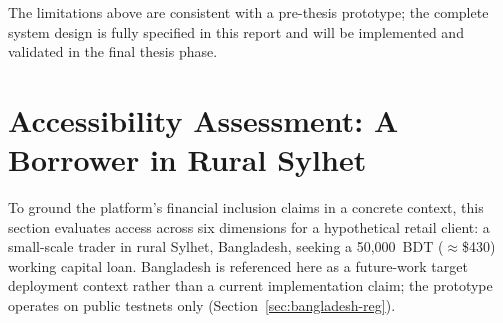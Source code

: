 \documentclass[12pt,a4paper]{report}
\begin{document}
The limitations above are consistent with a pre-thesis prototype; the complete system design is fully specified in this report and will be implemented and validated in the final thesis phase.

\section{Accessibility Assessment: A Borrower in Rural Sylhet}

To ground the platform's financial inclusion claims in a concrete context, this section evaluates access across six dimensions for a hypothetical retail client: a small-scale trader in rural Sylhet, Bangladesh, seeking a 50,000~BDT ($\approx$\$430) working capital loan. Bangladesh is referenced here as a future-work target deployment context rather than a current implementation claim; the prototype operates on public testnets only (Section~\ref{sec:bangladesh-reg}).
\end{document}
